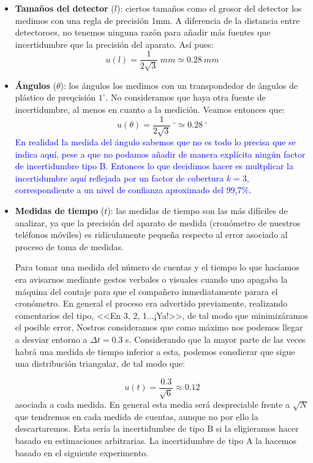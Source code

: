 \documentclass[11pt]{article}
\begin{document}
\begin{itemize}
	\item \textbf{Tamaños del detector} ($l$): ciertos tamaños como el grosor del detector los medimos con una regla de precisión 1mm. A diferencia de la distancia entre detectoroes, no tenemos ninguna razón para añadir más fuentes que incertidumbre que la precisión del aparato. Así pues: 
	\begin{equation}
		u (l)  = \frac{1}{2\sqrt3} \ \unit{mm} \simeq 0.28 \ \unit{mm}
	\end{equation}
	\item \textbf{Ángulos} ($\theta$): los ángulos los medimos con un transpondedor de ángulos de plástico de preqcisión $1^{\circ}$. No consideramos que haya otra fuente de incertidumbre, al menos en cuanto a la medición. Veamos entonces que:
	      \begin{equation}
		      u (\theta)  = \frac{1}{2\sqrt3} \ \unit{^\circ} \simeq 0.28 \ \unit{\unit{^\circ}}
	      \end{equation}
	\textcolor{blue}{En realidad la medida del ángulo sabemos que no es todo lo precisa que se indica aquí, pese a que no podamos añadir de manera explícita ningún factor de incertidumbre tipo B. Entonces lo que decidimos hacer es multplicar la incertidumbre aquí reflejada por un factor de cobertura $k=3$, correspondiente a un nivel de confianza aproximado del 99,7\%}.
	\item \textbf{Medidas de tiempo} ($t$): las medidas de tiempo son las más difíciles de analizar, ya que la precisión del aparato de medida (cronómetro de nuestros teléfonos móviles) es ridiculamente pequeña respecto al error asociado al proceso de toma de medidas.

	Para tomar una medida del número de cuentas y el tiempo lo que hacíamos era avisarnos mediante gestos verbales o visuales cuando uno apagaba la máquina del contaje para que el compañero inmediatamente parara el cronómetro. En general el proceso era advertido previamente, realizando comentarios del tipo, <<En 3, 2, 1...¡Ya!>>, de tal modo que minimizáramos el posible error, Nostros consideramos que como máximo nos podemos llegar a desviar entorno a $\Delta t=0.3$ s. Considerando que la mayor parte de las veces habrá una medida de tiempo inferior a esta, podemos consdierar que sigue una distribución triangular, de tal modo que:

	      \begin{equation}
		      u(t) = \frac{0.3}{\sqrt{6}} \approx 0.12
	      \end{equation}
	asociada a cada medida. En general esta media será despreciable frente a $\sqrt{N}$ que tendremos en cada medida de cuentas, aunque no por ello la descartaremos. Esta sería la incertidumbre de tipo B si la eligieramos hacer basado en estimaciones arbitrarias. La incertidumbre de tipo A la hacemos basado en el siguiente experimento. 


\end{itemize}
\end{document}
